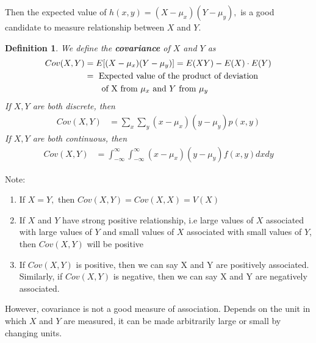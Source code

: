 \documentclass[11pt,oneside]{book}
\theoremstyle{newStyle}
\newtheorem{defn}[thm]{Definition}
\newcommand{\note}{\color{red}Note: \color{black}}
\begin{document}
Then the expected value of $h(x,y)=(X-\mu_x)(Y-\mu_y),$ is a good candidate to measure relationship between $X$ and $Y$. \begin{defn}
We define the \textbf{covariance} of $X$ and $Y$ as\begin{align*}
Cov(X,Y)&=E[(X-\mu_x)(Y-\mu_y)]=E(XY)-E(X)\cdot E(Y)\\
&=\text{  Expected value of the product of deviation}\\
&\text{\qquad of X from $\mu_x$ and $Y$ from $\mu_y$}
\end{align*}
If $X,Y$ are both discrete, then \begin{align*}
Cov(X,Y)&=\sum_{x}\sum_{y}(x-\mu_x)(y-\mu_y)p(x,y)
\end{align*}
If $X,Y$ are both continuous, then \begin{align*}
Cov(X,Y)&=\int_{-\infty}^{\infty}\int_{-\infty}^{\infty}(x-\mu_x)(y-\mu_y)f(x,y)dxdy
\end{align*}
\end{defn}
\note \begin{enumerate}
\item If $X=Y,$ then $Cov(X,Y)=Cov(X,X)=V(X)$
\item If $X$ and $Y$ have strong positive relationship, i.e large values of $X$ associated with large values of $Y$ and small values of $X$ associated with small values of $Y$, then $Cov(X,Y)$ will be positive
\item If $Cov(X,Y)$ is positive, then we can say X and Y are positively associated.\\
Similarly, if $Cov(X,Y)$ is negative, then we can say X and Y are negatively associated.
\end{enumerate}
However, covariance is not a good measure of association. Depends on the unit in which $X$ and $Y$ are measured, it can be made arbitrarily large or small by changing units.
\end{document}
